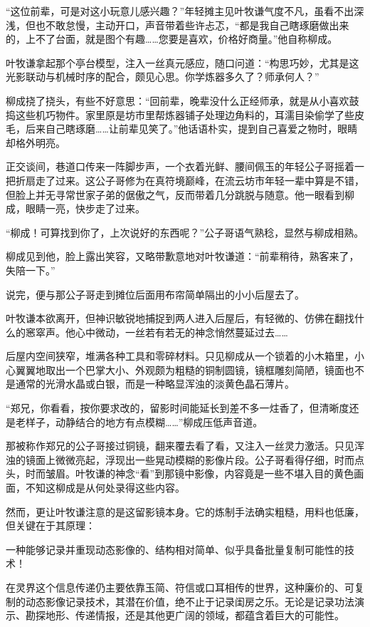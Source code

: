 “这位前辈，可是对这小玩意儿感兴趣？”年轻摊主见叶牧谦气度不凡，虽看不出深浅，但也不敢怠慢，主动开口，声音带着些许忐忑，“都是我自己瞎琢磨做出来的，上不了台面，就是图个有趣……您要是喜欢，价格好商量。”他自称柳成。

叶牧谦拿起那个亭台模型，注入一丝真元感应，随口问道：“构思巧妙，尤其是这光影联动与机械时序的配合，颇见心思。你学炼器多久了？师承何人？”

柳成挠了挠头，有些不好意思：“回前辈，晚辈没什么正经师承，就是从小喜欢鼓捣这些机巧物件。家里原是坊市里帮炼器铺子处理边角料的，耳濡目染偷学了些皮毛，后来自己瞎琢磨……让前辈见笑了。”他话语朴实，提到自己喜爱之物时，眼睛却格外明亮。

正交谈间，巷道口传来一阵脚步声，一个衣着光鲜、腰间佩玉的年轻公子哥摇着一把折扇走了过来。这公子哥修为在真符境巅峰，在流云坊市年轻一辈中算是不错，但脸上并无寻常世家子弟的倨傲之气，反而带着几分跳脱与随意。他一眼看到柳成，眼睛一亮，快步走了过来。

“柳成！可算找到你了，上次说好的东西呢？”公子哥语气熟稔，显然与柳成相熟。

柳成见到他，脸上露出笑容，又略带歉意地对叶牧谦道：“前辈稍待，熟客来了，失陪一下。”

说完，便与那公子哥走到摊位后面用布帘简单隔出的小小后屋去了。

叶牧谦本欲离开，但神识敏锐地捕捉到两人进入后屋后，有轻微的、仿佛在翻找什么的窸窣声。他心中微动，一丝若有若无的神念悄然蔓延过去……

后屋内空间狭窄，堆满各种工具和零碎材料。只见柳成从一个锁着的小木箱里，小心翼翼地取出一个巴掌大小、外观颇为粗糙的铜制圆镜，镜框雕刻简陋，镜面也不是通常的光滑水晶或白银，而是一种略显浑浊的淡黄色晶石薄片。

“郑兄，你看看，按你要求改的，留影时间能延长到差不多一炷香了，但清晰度还是老样子，动静结合的地方有点模糊……”柳成压低声音道。

那被称作郑兄的公子哥接过铜镜，翻来覆去看了看，又注入一丝灵力激活。只见浑浊的镜面上微微亮起，浮现出一些晃动模糊的影像片段。公子哥看得仔细，时而点头，时而皱眉。叶牧谦的神念“看”到那镜中影像，内容竟是一些不堪入目的黄色画面，不知这柳成是从何处录得这些内容。

然而，更让叶牧谦注意的是这留影镜本身。它的炼制手法确实粗糙，用料也低廉，但关键在于其原理：

一种能够记录并重现动态影像的、结构相对简单、似乎具备批量复制可能性的技术！

在灵界这个信息传递仍主要依靠玉简、符信或口耳相传的世界，这种廉价的、可复制的动态影像记录技术，其潜在价值，绝不止于记录闺房之乐。无论是记录功法演示、勘探地形、传递情报，还是其他更广阔的领域，都蕴含着巨大的可能性。

